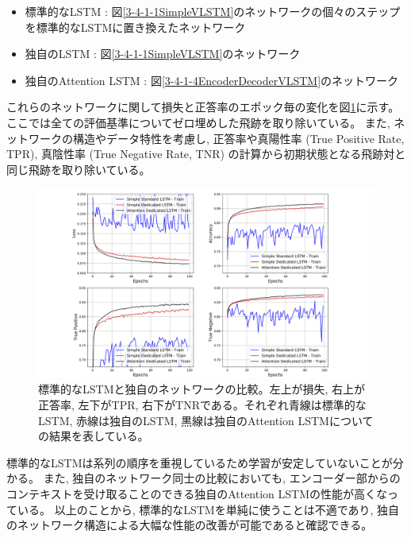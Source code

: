 \begin{itemize}
 \item 標準的なLSTM : 図\ref{3-4-1-1SimpleVLSTM}のネットワークの個々のステップを標準的なLSTMに置き換えたネットワーク
 \item 独自のLSTM : 図\ref{3-4-1-1SimpleVLSTM}のネットワーク
 \item 独自のAttention LSTM : 図\ref{3-4-1-4EncoderDecoderVLSTM}のネットワーク
\end{itemize}

これらのネットワークに関して損失と正答率のエポック毎の変化を図\ref{3-4-3-1LSTMvsVLSTM}に示す。
ここでは全ての評価基準についてゼロ埋めした飛跡を取り除いている。
また, ネットワークの構造やデータ特性を考慮し, 正答率や真陽性率 (True Positive Rate, TPR), 真陰性率 (True Negative Rate, TNR) の計算から初期状態となる飛跡対と同じ飛跡を取り除いている。

\begin{figure}[htbp]
 \centering
 \includegraphics[trim = 100 10 100 20, width=1.0\textwidth, clip]{Figure/3Networks/3-4-3-1LSTMvsVLSTM.png}
 \caption[標準的なLSTMと独自のネットワークの比較]{標準的なLSTMと独自のネットワークの比較。左上が損失, 右上が正答率, 左下がTPR, 右下がTNRである。それぞれ青線は標準的なLSTM, 赤線は独自のLSTM, 黒線は独自のAttention LSTMについての結果を表している。}
 \label{3-4-3-1LSTMvsVLSTM}
\end{figure}

標準的なLSTMは系列の順序を重視しているため学習が安定していないことが分かる。
また, 独自のネットワーク同士の比較においても, エンコーダー部からのコンテキストを受け取ることのできる独自のAttention LSTMの性能が高くなっている。
以上のことから, 標準的なLSTMを単純に使うことは不適であり, 独自のネットワーク構造による大幅な性能の改善が可能であると確認できる。\\

